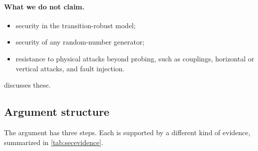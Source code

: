\paragraph{What we do not claim.}
\begin{itemize}
  \item security in the transition-robust model;
  \item security of any random-number generator;
  \item resistance to physical attacks beyond probing, such as couplings, horizontal or vertical attacks, and fault injection.
\end{itemize}
 discusses these.

\subsection{Argument structure}
The argument has three steps. Each is supported by a different kind of evidence, summarized in \cref{tab:secevidence}.

